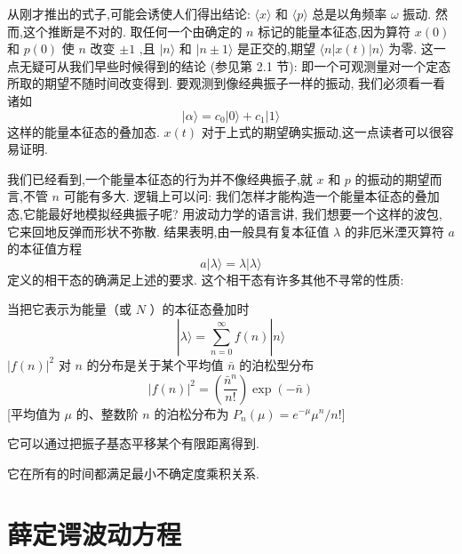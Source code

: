 \documentclass[lang=cn,newtx,10pt,scheme=chinese,thmcnt=section]{elegantbook}
\begin{document}
从刚才推出的式子,可能会诱使人们得出结论: $\langle x\rangle$ 和 $\langle p\rangle$ 总是以角频率 $\omega$ 振动. 然而,这个推断是不对的. 取任何一个由确定的 $n$ 标记的能量本征态,因为算符 $x\left( 0\right)$ 和 $p\left( 0\right)$ 使 $n$ 改变 $\pm 1$ ,且 $|n\rangle$ 和 $|n \pm 1\rangle$ 是正交的,期望 $\langle n | x\left( t\right) | n\rangle$ 为零. 这一点无疑可从我们早些时候得到的结论 (参见第 2.1 节): 即一个可观测量对一个定态所取的期望不随时间改变得到. 要观测到像经典振子一样的振动, 我们必须看一看诸如
\begin{equation}
	|\alpha \rangle = {c}_{0}\left| {0\rangle + {c}_{1}}\right| 1\rangle
\end{equation}
这样的能量本征态的叠加态. $x\left( t\right)$ 对于上式的期望确实振动,这一点读者可以很容易证明.

我们已经看到,一个能量本征态的行为并不像经典振子,就 $x$ 和 $p$ 的振动的期望而言,不管 $n$ 可能有多大. 逻辑上可以问: 我们怎样才能构造一个能量本征态的叠加态,它能最好地模拟经典振子呢? 用波动力学的语言讲, 我们想要一个这样的波包, 它来回地反弹而形状不弥散. 结果表明,由一般具有复本征值 $\lambda$ 的非厄米湮灭算符 $a$ 的本征值方程
\begin{equation}
	a\left| {\lambda \rangle = \lambda }\right| \lambda \rangle 
\end{equation}
定义的相干态的确满足上述的要求. 这个相干态有许多其他不寻常的性质:
\begin{property}
	当把它表示为能量（或 $N$ ）的本征态叠加时
	\begin{equation}
		| {\lambda \rangle = \mathop{\sum }\limits_{{n = 0}}^{\infty }f\left( n\right) }| n\rangle
	\end{equation}
	${\left| f\left( n\right) \right| }^{2}$ 对 $n$ 的分布是关于某个平均值 $\bar{n}$ 的泊松型分布
	\begin{equation}
		{\left| f\left( n\right) \right| }^{2} = \left( \frac{{\bar{n}}^{n}}{n!}\right) \exp \left( {-\bar{n}}\right)
	\end{equation}
	[平均值为 $\mu$ 的、整数阶 $n$ 的泊松分布为 ${P}_{n}\left( \mu \right) = {e}^{-\mu }{\mu }^{n}/n!$]
\end{property}
\begin{property}
	它可以通过把振子基态平移某个有限距离得到.
\end{property}
\begin{property}
	它在所有的时间都满足最小不确定度乘积关系.
\end{property}
\section{薛定谔波动方程}
\end{document}
